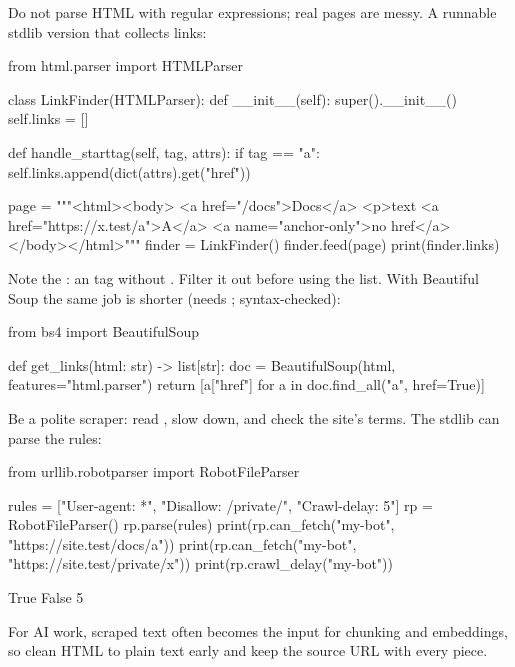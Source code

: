 Do not parse HTML with regular expressions; real pages are messy. A runnable stdlib version that
collects links:

\begin{pycode}
from html.parser import HTMLParser

class LinkFinder(HTMLParser):
    def __init__(self):
        super().__init__()
        self.links = []

    def handle_starttag(self, tag, attrs):
        if tag == "a":
            self.links.append(dict(attrs).get("href"))

page = """<html><body>
<a href="/docs">Docs</a> <p>text <a href="https://x.test/a">A</a>
<a name="anchor-only">no href</a>
</body></html>"""
finder = LinkFinder()
finder.feed(page)
print(finder.links)
\end{pycode}
\begin{rawcode}
\end{rawcode}

Note the : an  tag without . Filter it out before using the list.
With Beautiful Soup the same job is shorter (needs ; syntax-checked):

\begin{pycode}
from bs4 import BeautifulSoup

def get_links(html: str) -> list[str]:
    doc = BeautifulSoup(html, features="html.parser")
    return [a["href"] for a in doc.find_all("a", href=True)]
\end{pycode}

\begin{trap}
Be a polite scraper: read , slow down, and check the site's terms. The stdlib
can parse the rules:
\end{trap}

\begin{pycode}
from urllib.robotparser import RobotFileParser

rules = ["User-agent: *", "Disallow: /private/", "Crawl-delay: 5"]
rp = RobotFileParser()
rp.parse(rules)
print(rp.can_fetch("my-bot", "https://site.test/docs/a"))
print(rp.can_fetch("my-bot", "https://site.test/private/x"))
print(rp.crawl_delay("my-bot"))
\end{pycode}
\begin{rawcode}
True
False
5
\end{rawcode}

For AI work, scraped text often becomes the input for chunking and embeddings, so clean HTML to
plain text early and keep the source URL with every piece.

